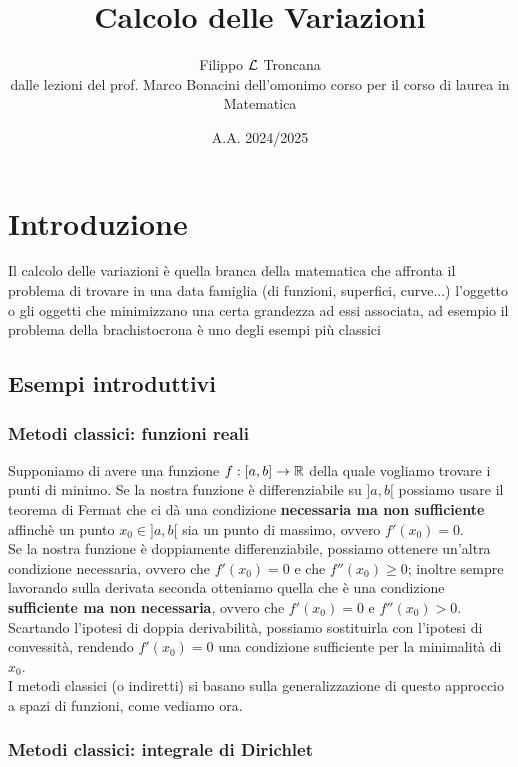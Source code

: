 \documentclass[openany]{book}
\title{Calcolo delle Variazioni}
\author{Filippo $\mathcal{L}$ Troncana\\dalle lezioni del prof. Marco Bonacini dell'omonimo corso per il corso di laurea in Matematica}
\date{A.A. 2024/2025}
\begin{document}
\nocite{*}
\maketitle

\tableofcontents

\pagebreak


\section*{Introduzione}

Il calcolo delle variazioni è quella branca della matematica che affronta il problema di trovare in una data famiglia (di funzioni, superfici, curve...) l'oggetto o gli oggetti che minimizzano una certa grandezza ad essi associata, ad esempio il problema della brachistocrona è uno degli esempi più classici

\subsection*{Esempi introduttivi}

\subsubsection*{Metodi classici: funzioni reali}

Supponiamo di avere una funzione $f:[a,b]\to\mathbb{R}$ della quale vogliamo trovare i punti di minimo. Se la nostra funzione è differenziabile su $]a,b[$ possiamo usare il teorema di Fermat che ci dà una condizione \textbf{necessaria ma non sufficiente} affinchè un punto $x_0 \in ]a,b[$ sia un punto di massimo, ovvero $f'(x_0) = 0$.\\
Se la nostra funzione è doppiamente differenziabile, possiamo ottenere un'altra condizione necessaria, ovvero che $f'(x_0) = 0$ e che $f''(x_0) \ge 0$; inoltre sempre lavorando sulla derivata seconda otteniamo quella che è una condizione \textbf{sufficiente ma non necessaria}, ovvero che $f'(x_0) = 0$ e $f''(x_0) > 0$.\\
Scartando l'ipotesi di doppia derivabilità, possiamo sostituirla con l'ipotesi di convessità, rendendo $f'(x_0) = 0$ una condizione sufficiente per la minimalità di $x_0$.\\
I metodi classici (o indiretti) si basano sulla generalizzazione di questo approccio a spazi di funzioni, come vediamo ora.

\subsubsection*{Metodi classici: integrale di Dirichlet}
\end{document}

